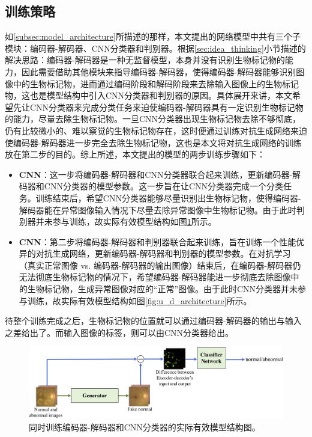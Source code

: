 \subsection{训练策略}\label{subsec:traing_stragies}
如\ref{subsec:model_architecture}所描述的那样，本文提出的网络模型中共有三个子模块：编码器-解码器、CNN分类器和判别器。根据\ref{sec:idea_thinking}小节描述的解决思路：编码器-解码器是一种无监督模型，本身并没有识别生物标记物的能力，因此需要借助其他模块来指导编码器-解码器，使得编码器-解码器能够识别图像中的生物标记物，进而通过编码阶段和解码阶段来去除输入图像上的生物标记物，这也是模型结构中引入CNN分类器和判别器的原因。具体展开来讲，本文希望先让CNN分类器来完成分类任务来迫使编码器-解码器具有一定识别生物标记物的能力，尽量去除生物标记物。一旦CNN分类器出现生物标记物去除不够彻底，仍有比较微小的、难以察觉的生物标记物存在，这时便通过训练对抗生成网络来迫使编码器-解码器进一步完全去除生物标记物，这也是本文将对抗生成网络的训练放在第二步的目的。综上所述，本文提出的模型的两步训练步骤如下：
\begin{itemize}\label{item:training_steps}
	\item 
	\textbf{CNN}：这一步将编码器-解码器和CNN分类器联合起来训练，更新编码器-解码器和CNN分类器的模型参数。这一步旨在让CNN分类器完成一个分类任务。训练结束后，希望CNN分类器能够尽量识别出生物标记物，使得编码器-解码器能在异常图像输入情况下尽量去除异常图像中生物标记物。由于此时判别器并未参与训练，故实际有效模型结构如图\ref{fig:u_c_architecture}所示。
	\item {}\textbf{CNN}：第二步将编码器-解码器和判别器联合起来训练，旨在训练一个性能优异的对抗生成网络，更新编码器-解码器和判别器的模型参数。在对抗学习（真实正常图像 vs. 编码器-解码器的输出图像）结束后，在编码器-解码器仍无法彻底生物标记物的情况下，希望编码器-解码器能进一步彻底去除图像中的生物标记物，生成异常图像对应的“正常”图像。由于此时CNN分类器并未参与训练，故实际有效模型结构如图\ref{fig:u_d_architecture}所示。
\end{itemize}
\noindent 待整个训练完成之后，生物标记物的位置就可以通过编码器-解码器的输出与输入之差给出了。而输入图像的标签，则可以由CNN分类器给出。
\begin{figure}[h]
	\centering
	\includegraphics[width=1.0\textwidth]{figure/u_c_architecture.png}
	\caption{同时训练编码器-解码器和CNN分类器的实际有效模型结构图。}
	\label{fig:u_c_architecture}
\end{figure}
